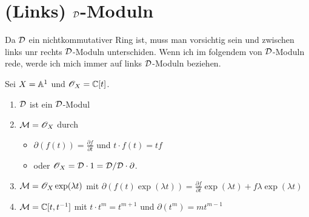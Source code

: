 \begin{comment}
\subsection{Weyl Algebra als Graduierter Ring}
Sei $A$ nun einer der drei Koeffizienten Ringe, welche zuvor behandelt
wurden.  Der Ring $A<\partial_x>$ kommt zusammen mit einer aufsteigenden
Filtrierung, welche wir mit $F(A<\partial_x)$ bezeichen werden.  Sei $P$ ein
bzgl. \ref{prop:weyl_eindeutige_schreibung} minimal geschriebener Operator,
so ist $P$ in $F_k$ falls der maximale Grad von $\partial_x$ in $P$ kleiner
oder gleich $k$. So definiere den Grad $deg P$ von $P$ als die Eindeutige
ganze Zahl $k$ mit $P\in F_kA<\partial_x>\slash F_{k-1}<\partial_x>$

Unabhängigkeit von Schreibung wird in Sabbah Script behauptet
\end{comment}

\section{(Links) $\mathcal{D}$-Moduln}
\cite[Chapter 1.6.]{arapuraNotes}
Da $\mathcal{D}$ ein nichtkommutativer Ring ist, muss man vorsichtig sein und zwischen
links unr rechts $\mathcal{D}$-Moduln unterschiden. Wenn ich im folgendem von
$\mathcal{D}$-Moduln rede, werde ich mich immer auf links $\mathcal{D}$-Moduln beziehen.

\begin{exmp}
Sei $X=\mathbb{A}^1$ und $\mathscr{O}_X=\mathbb{C}[t]$.
\begin{enumerate}
\item $\mathcal{D}$ ist ein $\mathcal{D}$-Modul
\item $\mathcal{M}=\mathscr{O}_X$ durch
\begin{itemize}
\item $\partial(f(t))=\frac{\partial f}{\partial t}$ und
$t\cdot f(t)=tf$
\item oder \cite[Exmp 3.1.2]{ginzburg} $\mathscr{O}_X=\mathcal{D}\cdot1=\mathcal{D}/\mathcal{D}\cdot\partial$.
\end{itemize}
\item $\mathcal{M}=\mathscr{O}_X\exp(\lambda t)$ mit $\partial(f(t)\exp(\lambda
t))=\frac{\partial f}{\partial t}\exp(\lambda t)+f\lambda\exp(\lambda t)$
\item $\mathcal{M}=\mathbb{C}[t,t^{-1}]$ mit $t\cdot t^{m}=t^{m+1}$ und
$\partial(t^m)=mt^{m-1}$
\end{enumerate}
\end{exmp}

